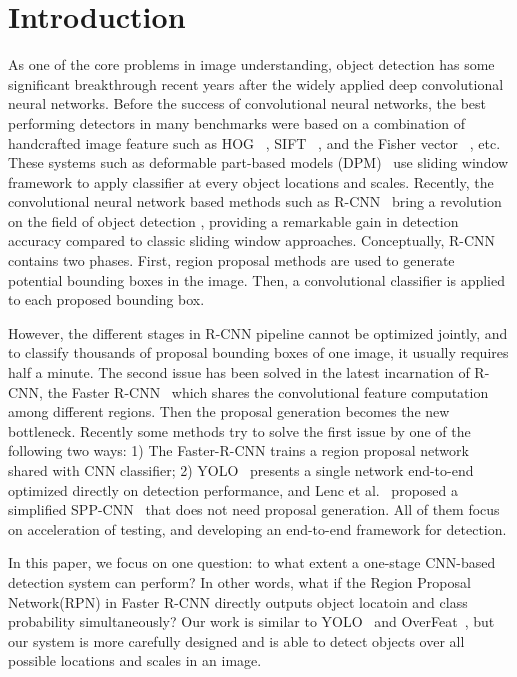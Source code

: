 \section{Introduction}

As one of the core problems in image understanding, object detection has some significant breakthrough recent years after the widely applied deep convolutional neural networks. Before the success of convolutional neural networks, the best performing detectors in many benchmarks were based on a combination of handcrafted image feature such as HOG~\cite{dalal2005histograms} , SIFT~\cite{lowe2004distinctive} , and the Fisher vector~\cite{cinbis2013segmentation} , etc. These systems such as deformable part-based models (DPM)~\cite{felzenszwalb2010object} use sliding window framework to apply classifier at every object locations and scales. Recently, the convolutional neural network based methods such as R-CNN~\cite{girshick2014rich,girshick2015fast} bring a revolution on the field of object detection , providing a remarkable gain in detection accuracy compared to classic sliding window approaches. Conceptually, R-CNN contains two phases. First, region proposal methods are used to generate potential bounding boxes in the image. Then, a convolutional classifier is applied to each proposed bounding box. 

However, the different stages in R-CNN pipeline cannot be optimized jointly, and to classify thousands of proposal bounding boxes of one image, it usually requires half a minute. The second issue has been solved in the latest incarnation of R-CNN, the Faster R-CNN~\cite{ren2015faster} which shares the convolutional feature computation among different regions. Then the proposal generation becomes the new bottleneck. Recently some methods try to solve the first issue by one of the following two ways: 1) The Faster-R-CNN trains a region proposal network shared with CNN classifier; 2) YOLO~\cite{YOLO}  presents a single network end-to-end optimized directly on detection performance, and Lenc et al.~\cite{LencV15} proposed a simplified SPP-CNN~\cite{} that does not need proposal generation. All of them focus on acceleration of testing, and developing an end-to-end framework for detection. 

In this paper, we  focus on one question: to what extent a one-stage CNN-based detection system can perform?  In other words, what if the Region Proposal Network(RPN) in Faster R-CNN directly outputs object locatoin and class probability simultaneously? Our work is similar to YOLO~\cite{YOLO} and OverFeat~\cite{sermanet2013overfeat}, but our system is more carefully designed and is able to detect objects over all possible locations and scales in an image. 

